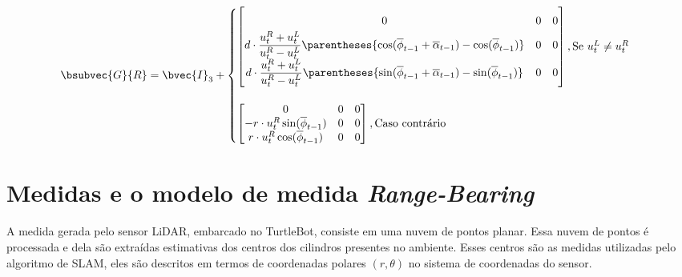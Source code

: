 \begin{equation}
  \bsubvec{G}{R} = \bvec{I}_3 + \begin{cases}
    \renewcommand{\arraystretch}{1.8}
    \begin{bmatrix}
      0 & 0 & 0 \\
      \factor \parentheses{\cos(\overline{\phi}_{t-1} + \overline{\alpha}_{t-1}) - \cos(\overline{\phi}_{t-1})} & 0 & 0 \\
      \factor \parentheses{\sin(\overline{\phi}_{t-1} + \overline{\alpha}_{t-1}) - \sin(\overline{\phi}_{t-1})} & 0 & 0  
    \end{bmatrix}, \text{Se } u_t^L \neq u_t^R \\
    \\
    \renewcommand{\arraystretch}{1}
    \begin{bmatrix}
      0 & 0 & 0 \\
      -r\cdot u_t^R \sin(\overline{\phi}_{t-1}) & 0 & 0 \\
      r\cdot u_t^R \cos(\overline{\phi}_{t-1}) & 0 & 0  
    \end{bmatrix}, \text{Caso contrário}
  \end{cases}
  \label{eq:motion-model-jacobian}
\end{equation}

\section{Medidas e o modelo de medida \textit{Range-Bearing}}
\label{sec:slam-measurement}
A medida gerada pelo sensor LiDAR, embarcado no TurtleBot, consiste em uma nuvem de pontos planar. Essa nuvem de pontos é processada e dela são extraídas estimativas dos centros dos cilindros presentes no ambiente. Esses 
centros são as medidas utilizadas pelo algoritmo de SLAM, eles são descritos 
em termos de coordenadas polares $(r, \theta)$ no sistema de coordenadas do sensor.

